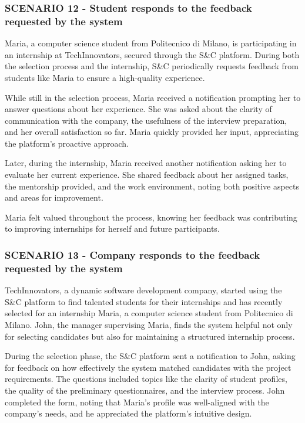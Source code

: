 \subsubsection{SCENARIO 12 - Student responds to the feedback requested by the system}
Maria, a computer science student from Politecnico di Milano, is participating in an internship
at TechInnovators, secured through the S\&C platform. During both the selection process and the
internship, S\&C periodically requests feedback from students like Maria to ensure a high-quality
experience.  

While still in the selection process, Maria received a notification prompting her to answer questions
about her experience. She was asked about the clarity of communication with the company, the usefulness
of the interview preparation, and her overall satisfaction so far. Maria quickly provided her input,
appreciating the platform’s proactive approach.  

Later, during the internship, Maria received another notification asking her to evaluate her
current experience. She shared feedback about her assigned tasks, the mentorship provided,
and the work environment, noting both positive aspects and areas for improvement.  

Maria felt valued throughout the process, knowing her feedback was contributing to improving
internships for herself and future participants.
\subsubsection{SCENARIO 13 - Company responds to the feedback requested by the system}
TechInnovators, a dynamic software development company, started using the S\&C platform
to find talented students for their internships and has recently selected for an internship Maria,
a computer science student from Politecnico di Milano. John, the manager supervising Maria,
finds the system helpful not only for selecting candidates but also for maintaining a structured
internship process.  

During the selection phase, the S\&C platform sent a notification to John, asking for feedback
on how effectively the system matched candidates with the project requirements. The questions
included topics like the clarity of student profiles, the quality of the preliminary questionnaires,
and the interview process. John completed the form, noting that Maria’s profile was well-aligned with
the company’s needs, and he appreciated the platform’s intuitive design.  

